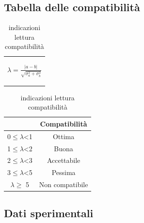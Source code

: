\documentclass{article}
\begin{document}
	\subsection{Tabella delle compatibilità}
	\medskip
	\begin{table}[H]
		\centering
		\begin{tabular}{c}
			\begin{Large}
			$\lambda=\frac{|a-b|}{\sqrt{\sigma_a^2+\sigma_b^2}}$
			\end{Large}\\
		\end{tabular}
		\hspace{0.5cm}
		\begin{tabular}{cc}
			\toprule
			&       \textbf{Compatibilità   }       \\
			\midrule
			0$\leq \lambda$<1   &Ottima                 \\
			1$\leq \lambda$<2   &Buona                  \\
			2$\leq \lambda$<3   &Accettabile            \\
			3$\leq\lambda$<5   &Pessima                \\
			$ \lambda \geq $  5     &Non compatibile        \\
			\bottomrule
		\end{tabular}
		\caption{indicazioni lettura compatibilità}
		\label{tab:compatibilità}
	\end{table}

	\subsection{Dati sperimentali}


   
\end{document}
